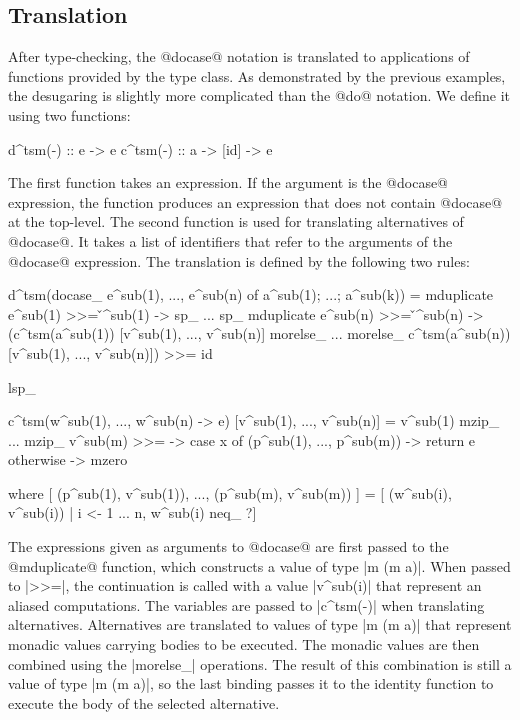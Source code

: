 \documentclass[preprint]{sigplanconf}
\begin{document}
\subsection{Translation}
\label{sec:extension-translation}

After type-checking, the @docase@ notation is translated to applications of functions provided by the 
 type class. As demonstrated by the previous examples, the desugaring is slightly more 
complicated than the @do@ notation. We define it using two functions:

\begin{code}
d^tsm(-)  :: e -> e
c^tsm(-)  :: a -> [id] -> e
\end{code}
The first function takes an expression. If the argument is the @docase@ expression, the function
produces an expression that does not contain @docase@ at the top-level. The second function is used
for translating alternatives of @docase@. It takes a list of identifiers that refer to the arguments
of the @docase@ expression. The translation is defined by the following two rules:

\begin{code}
d^tsm(docase_ e^sub(1), ..., e^sub(n) of a^sub(1); ...; a^sub(k)) =
  mduplicate e^sub(1) >>= \v^sub(1) -> sp_ ... sp_ mduplicate e^sub(n) >>= \v^sub(n) ->
  (c^tsm(a^sub(1)) [v^sub(1), ..., v^sub(n)] morelse_ ... morelse_ c^tsm(a^sub(n)) [v^sub(1), ..., v^sub(n)]) >>= id

lsp_

c^tsm(w^sub(1), ..., w^sub(n) -> e) [v^sub(1), ..., v^sub(n)] = 
  v^sub(1) mzip_ ... mzip_ v^sub(m) >>= \x -> case x of 
    (p^sub(1), ..., p^sub(m))  -> return e
    otherwise                  -> mzero

  where  [ (p^sub(1), v^sub(1)), ..., (p^sub(m), v^sub(m)) ] = 
           [ (w^sub(i), v^sub(i)) | i <- 1 ... n, w^sub(i) neq_ ?]
\end{code}
The expressions given as arguments to @docase@ are first passed to the @mduplicate@ function, which
constructs a value of type |m (m a)|. When passed to |>>=|, the continuation is called with a value
|v^sub(i)| that represent an aliased computations. The variables are passed to |c^tsm(-)| when 
translating alternatives. Alternatives are translated to values of type |m (m a)| that represent 
monadic values carrying bodies to be executed. The monadic values are then combined using the |morelse_| 
operations. The result of this combination is still a value of type |m (m a)|, so the last binding 
passes it to the identity function to execute the body of the selected alternative.
\end{document}
